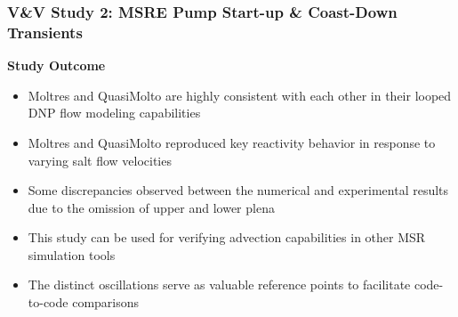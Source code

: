 \begin{frame}
  \frametitle{V\&V Study 2: MSRE Pump Start-up \& Coast-Down Transients}
  \begin{block}{\textbf{Study Outcome}}
    \begin{itemize}
      \item Moltres and QuasiMolto are highly consistent with each other in their looped DNP flow
        modeling capabilities
      \item Moltres and QuasiMolto reproduced key reactivity behavior in response to varying salt
        flow velocities
      \item Some discrepancies observed between the numerical and experimental results due to the
        omission of upper and lower plena
      \item This study can be used for verifying advection capabilities in other MSR simulation tools
      \item The distinct oscillations serve as valuable reference points to facilitate code-to-code
        comparisons
    \end{itemize}
  \end{block}
\end{frame}
